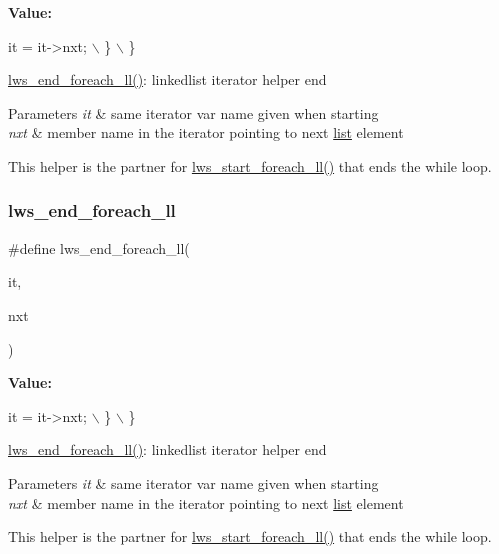 {\bfseries Value\+:}
\begin{DoxyCode}
it = it->nxt; \(\backslash\)
    \} \(\backslash\)
\}
\end{DoxyCode}
\hyperlink{group__misc_ga9d94995ca7a1be16bf3d7bd2e449c812}{lws\+\_\+end\+\_\+foreach\+\_\+ll()}\+: linkedlist iterator helper end


\begin{DoxyParams}{Parameters}
{\em it} & same iterator var name given when starting \\
\hline
{\em nxt} & member name in the iterator pointing to next \hyperlink{protocollist-p}{list} element\\
\hline
\end{DoxyParams}
This helper is the partner for \hyperlink{group__misc_ga9f138b98c73782807d88e76c1c532dc2}{lws\+\_\+start\+\_\+foreach\+\_\+ll()} that ends the while loop. \mbox{\label{group__misc_ga9d94995ca7a1be16bf3d7bd2e449c812}} 
\subsubsection{\texorpdfstring{lws\+\_\+end\+\_\+foreach\+\_\+ll}{lws\_end\_foreach\_ll}\hspace{0.1cm}{\footnotesize\ttfamily [2/6]}}
{\footnotesize\ttfamily \#define lws\+\_\+end\+\_\+foreach\+\_\+ll(\begin{DoxyParamCaption}\item[{}]{it,  }\item[{}]{nxt }\end{DoxyParamCaption})}

{\bfseries Value\+:}
\begin{DoxyCode}
it = it->nxt; \(\backslash\)
    \} \(\backslash\)
\}
\end{DoxyCode}
\hyperlink{group__misc_ga9d94995ca7a1be16bf3d7bd2e449c812}{lws\+\_\+end\+\_\+foreach\+\_\+ll()}\+: linkedlist iterator helper end


\begin{DoxyParams}{Parameters}
{\em it} & same iterator var name given when starting \\
\hline
{\em nxt} & member name in the iterator pointing to next \hyperlink{protocollist-p}{list} element\\
\hline
\end{DoxyParams}
This helper is the partner for \hyperlink{group__misc_ga9f138b98c73782807d88e76c1c532dc2}{lws\+\_\+start\+\_\+foreach\+\_\+ll()} that ends the while loop. \mbox{\label{group__misc_ga9d94995ca7a1be16bf3d7bd2e449c812}} 
